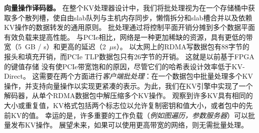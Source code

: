 
\textbf{向量操作译码器。}
在整个KV处理器设计中，我们将批处理视为在一个存储桶中获取多个散列槽，使自由slab队列与主机内存同步，懒惰拆分和slab槽合并以及依赖KV操作的数据转发的通用原则。
批处理通过将控制平面开销分摊到多个数据平面有效负载来提高性能。
与PCIe相比，网络是一种更加稀缺的资源，具有更低的带宽（5~GB / s）和更高的延迟（2~$\mu$s）。
以太网上的RDMA写数据包有88字节的报头和填充开销，而PCIe TLP数据包只有26字节的开销。
这就是以前基于FPGA的键值存储 \cite{blott13hotcloud,blott2015scaling} 没有使PCIe带宽饱和的原因，尽管它们的哈希表设计效率低于KV-Direct。
这需要在两个方面进行\textit {客户端批处理}：在一个数据包中批量处理多个KV操作，并支持向量操作以实现更紧凑的表示。为此，我们在KV引擎中实现了一个解码器，从单个RDMA数据包中解压缩多个KV操作。
观察到许多KV具有相同的大小或重复值，KV格式包括两个标志位以允许复制密钥和值大小，或者包中的先前KV的值。
幸运的是，许多重要的工作负载（\textit {例如图遍历，参数服务器}）可以批量发布KV操作。
展望未来，如果可以使用更高带宽的网络，则无需批量处理。
